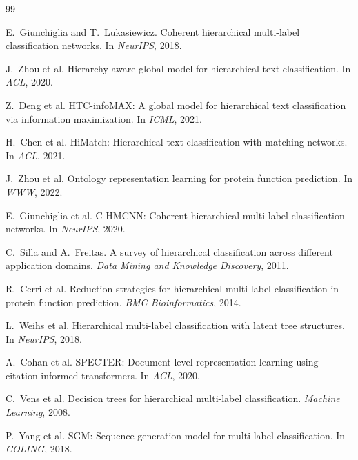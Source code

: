 \documentclass[11pt,a4paper]{article}
\begin{document}

\begin{thebibliography}{99}

E.~Giunchiglia and T.~Lukasiewicz.
\newblock Coherent hierarchical multi-label classification networks.
\newblock In \emph{NeurIPS}, 2018.

J.~Zhou et al.
\newblock Hierarchy-aware global model for hierarchical text classification.
\newblock In \emph{ACL}, 2020.

Z.~Deng et al.
\newblock HTC-infoMAX: A global model for hierarchical text classification via
information maximization.
\newblock In \emph{ICML}, 2021.

H.~Chen et al.
\newblock HiMatch: Hierarchical text classification with matching networks.
\newblock In \emph{ACL}, 2021.

J.~Zhou et al.
\newblock Ontology representation learning for protein function prediction.
\newblock In \emph{WWW}, 2022.

E.~Giunchiglia et al.
\newblock C-HMCNN: Coherent hierarchical multi-label classification networks.
\newblock In \emph{NeurIPS}, 2020.

C.~Silla and A.~Freitas.
\newblock A survey of hierarchical classification across different application
domains.
\newblock \emph{Data Mining and Knowledge Discovery}, 2011.

R.~Cerri et al.
\newblock Reduction strategies for hierarchical multi-label classification in
protein function prediction.
\newblock \emph{BMC Bioinformatics}, 2014.

L.~Weihs et al.
\newblock Hierarchical multi-label classification with latent tree structures.
\newblock In \emph{NeurIPS}, 2018.

A.~Cohan et al.
\newblock SPECTER: Document-level representation learning using
citation-informed transformers.
\newblock In \emph{ACL}, 2020.

C.~Vens et al.
\newblock Decision trees for hierarchical multi-label classification.
\newblock \emph{Machine Learning}, 2008.

P.~Yang et al.
\newblock SGM: Sequence generation model for multi-label classification.
\newblock In \emph{COLING}, 2018.


\end{thebibliography}
\end{document}
